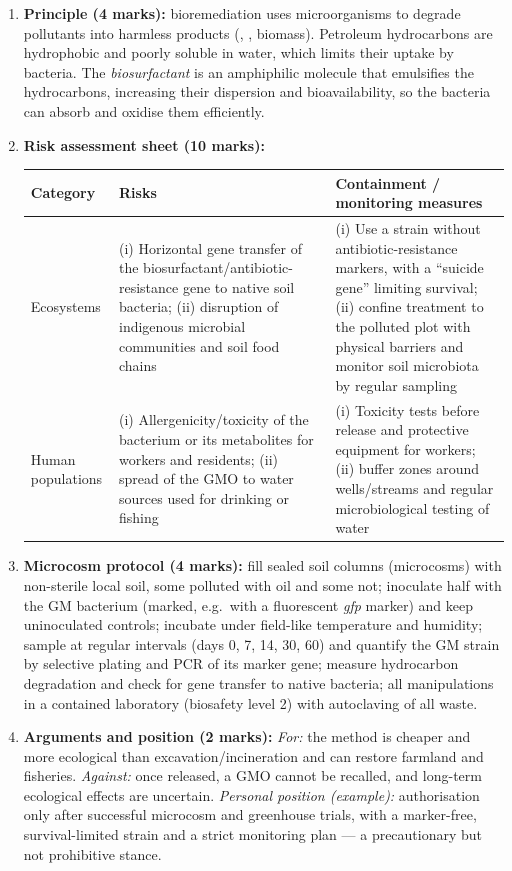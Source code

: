 \documentclass[11pt]{article}
\newcommand{\cle}[1]{{\popxbold\color{popdark}#1}}
\begin{document}
\begin{corrige}
\begin{enumerate}
\item \textbf{Principle (4 marks):} \cle{bioremediation} uses microorganisms to degrade pollutants into harmless products (, , biomass). Petroleum hydrocarbons are hydrophobic and poorly soluble in water, which limits their uptake by bacteria. The \emph{biosurfactant} is an amphiphilic molecule that emulsifies the hydrocarbons, increasing their dispersion and bioavailability, so the bacteria can absorb and oxidise them efficiently.
\item \textbf{Risk assessment sheet (10 marks):}
\begin{center}
\begin{tabularx}{\linewidth}{|l|X|X|}
\hline
\rowcolor{popblueL} Category & Risks & Containment / monitoring measures \\
\hline Ecosystems & (i) Horizontal gene transfer of the biosurfactant/antibiotic-resistance gene to native soil bacteria; (ii) disruption of indigenous microbial communities and soil food chains & (i) Use a strain without antibiotic-resistance markers, with a ``suicide gene'' limiting survival; (ii) confine treatment to the polluted plot with physical barriers and monitor soil microbiota by regular sampling \\
\hline Human populations & (i) Allergenicity/toxicity of the bacterium or its metabolites for workers and residents; (ii) spread of the GMO to water sources used for drinking or fishing & (i) Toxicity tests before release and protective equipment for workers; (ii) buffer zones around wells/streams and regular microbiological testing of water \\
\hline
\end{tabularx}
\end{center}
\item \textbf{Microcosm protocol (4 marks):} fill sealed soil columns (microcosms) with non-sterile local soil, some polluted with oil and some not; inoculate half with the GM bacterium (marked, e.g.\ with a fluorescent \emph{gfp} marker) and keep uninoculated controls; incubate under field-like temperature and humidity; sample at regular intervals (days 0, 7, 14, 30, 60) and quantify the GM strain by selective plating and PCR of its marker gene; measure hydrocarbon degradation and check for gene transfer to native bacteria; all manipulations in a contained laboratory (biosafety level 2) with autoclaving of all waste.
\item \textbf{Arguments and position (2 marks):} \emph{For:} the method is cheaper and more ecological than excavation/incineration and can restore farmland and fisheries. \emph{Against:} once released, a GMO cannot be recalled, and long-term ecological effects are uncertain. \emph{Personal position (example):} authorisation only after successful microcosm and greenhouse trials, with a marker-free, survival-limited strain and a strict monitoring plan — a precautionary but not prohibitive stance.
\end{enumerate}
\end{corrige}
\end{document}
